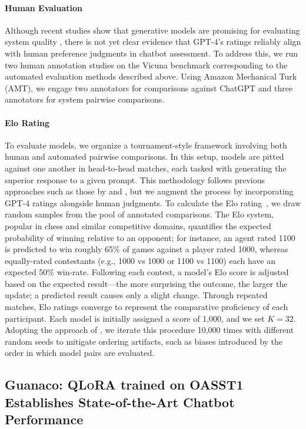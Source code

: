 \paragraph{Human Evaluation} Although recent studies show that generative models are promising for evaluating system quality \citep{fu2023gptscore}, there is not yet clear evidence that GPT-4’s ratings reliably align with human preference judgments in chatbot assessment. To address this, we run two human annotation studies on the Vicuna benchmark corresponding to the automated evaluation methods described above. Using Amazon Mechanical Turk (AMT), we engage two annotators for comparisons against ChatGPT and three annotators for system pairwise comparisons.

\paragraph{Elo Rating} To evaluate models, we organize a tournament-style framework involving both human and automated pairwise comparisons. In this setup, models are pitted against one another in head-to-head matches, each tasked with generating the superior response to a given prompt. This methodology follows previous approaches such as those by \citet{bai2022training} and \citet{vicuna2023}, but we augment the process by incorporating GPT-4 ratings alongside human judgments. To calculate the Elo rating~\citep{elo1967proposed,elo1978rating}, we draw random samples from the pool of annotated comparisons. The Elo system, popular in chess and similar competitive domains, quantifies the expected probability of winning relative to an opponent; for instance, an agent rated 1100 is predicted to win roughly 65\% of games against a player rated 1000, whereas equally-rated contestants (e.g., 1000 vs 1000 or 1100 vs 1100) each have an expected 50\% win-rate. Following each contest, a model's Elo score is adjusted based on the expected result—the more surprising the outcome, the larger the update; a predicted result causes only a slight change. Through repeated matches, Elo ratings converge to represent the comparative proficiency of each participant. Each model is initially assigned a score of 1,000, and we set $K=32$. Adopting the approach of \citet{vicuna2023}, we iterate this procedure 10,000 times with different random seeds to mitigate ordering artifacts, such as biases introduced by the order in which model pairs are evaluated.

\subsection{\textbf{Guanaco}: \textsc{QLoRA} trained on OASST1 Establishes State-of-the-Art Chatbot Performance}

